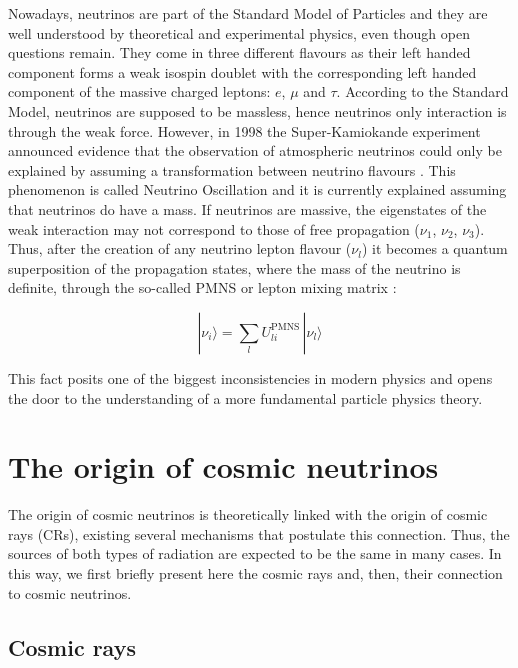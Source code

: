 Nowadays, neutrinos are part of the Standard Model of Particles and they are well understood by theoretical and experimental physics, even though open questions remain. They come in three different flavours \cite{neutrino_muon, neutrino_tau} as their left handed component forms a weak isospin doublet with the corresponding left handed component of the massive charged leptons: $e$, $\mu$ and $\tau$. According to the Standard Model, neutrinos are supposed to be massless, hence neutrinos only interaction is through the weak force. However, in 1998 the Super-Kamiokande experiment announced evidence that the observation of atmospheric neutrinos could only be explained by assuming a transformation between neutrino flavours \cite{Super}. This phenomenon is called Neutrino Oscillation and it is currently explained assuming that neutrinos do have a mass. If neutrinos are massive, the eigenstates of the weak interaction may not correspond to those of free propagation ($\nu_1$, $\nu_2$, $\nu_3$). Thus, after the creation of any neutrino lepton flavour ($\nu_l$) it becomes a quantum superposition of the propagation states, where the mass of the neutrino is definite, through the so-called PMNS or lepton mixing matrix \cite{PMNS2, PMNS}:

\begin{equation}
	|\nu_i\rangle = \sum_{l} U_{li}^{\mathrm{PMNS}} \, |\nu_l\rangle
\end{equation}

This fact posits one of the biggest inconsistencies in modern physics and opens the door to the understanding of a more fundamental particle physics theory.

\section{The origin of cosmic neutrinos}

The origin of cosmic neutrinos is theoretically linked with the origin of cosmic rays (CRs), existing several mechanisms that postulate this connection. Thus, the sources of both types of radiation are expected to be the same in many cases. In this way, we first briefly present here the cosmic rays and, then, their connection to cosmic neutrinos.%

\subsection{Cosmic rays}

